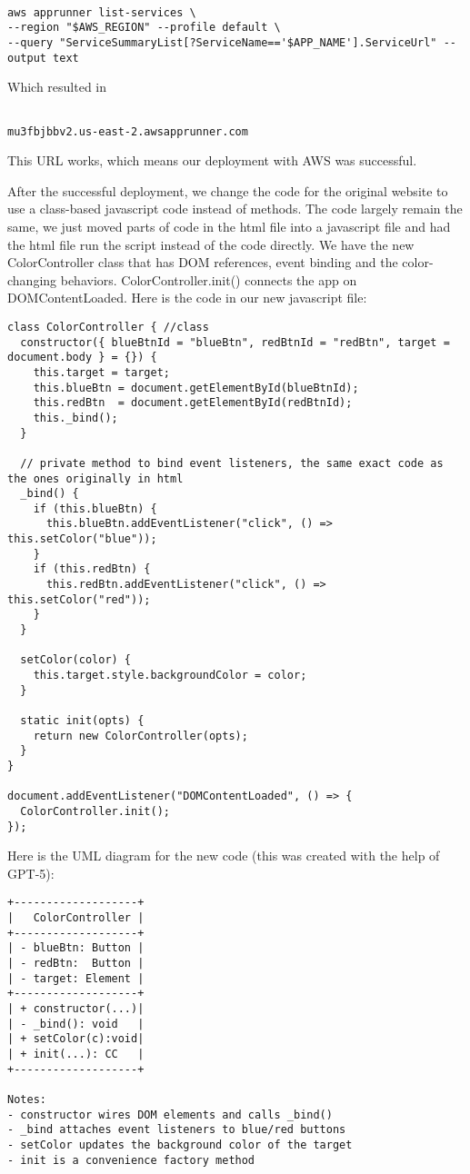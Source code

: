 \begin{verbatim}

aws apprunner list-services \
--region "$AWS_REGION" --profile default \
--query "ServiceSummaryList[?ServiceName=='$APP_NAME'].ServiceUrl" --output text

\end{verbatim}

\noindent Which resulted in

\begin{verbatim}

mu3fbjbbv2.us-east-2.awsapprunner.com

\end{verbatim}

\noindent This URL works, which means our deployment with AWS was successful.


\noindent After the successful deployment, we change the code for the original website to use a class-based javascript code instead of methods. The code largely remain the same, we just moved parts of code in the html file into a javascript file and had the html file run the script instead of the code directly. We have the new ColorController class that has DOM references, event binding and the color-changing behaviors. ColorController.init() connects the app on DOMContentLoaded. Here is the code in our new javascript file:

\begin{verbatim}
class ColorController { //class 
  constructor({ blueBtnId = "blueBtn", redBtnId = "redBtn", target = document.body } = {}) {
    this.target = target;
    this.blueBtn = document.getElementById(blueBtnId);
    this.redBtn  = document.getElementById(redBtnId);
    this._bind();
  }

  // private method to bind event listeners, the same exact code as the ones originally in html
  _bind() {
    if (this.blueBtn) {
      this.blueBtn.addEventListener("click", () => this.setColor("blue"));
    }
    if (this.redBtn) {
      this.redBtn.addEventListener("click", () => this.setColor("red"));
    }
  }

  setColor(color) {
    this.target.style.backgroundColor = color;
  }

  static init(opts) {
    return new ColorController(opts);
  }
}

document.addEventListener("DOMContentLoaded", () => {
  ColorController.init();
});

\end{verbatim}

Here is the UML diagram for the new code (this was created with the help of GPT-5):

\begin{verbatim}
+-------------------+
|   ColorController |
+-------------------+
| - blueBtn: Button |
| - redBtn:  Button |
| - target: Element |
+-------------------+
| + constructor(...)|
| - _bind(): void   |
| + setColor(c):void|
| + init(...): CC   |
+-------------------+

Notes:
- constructor wires DOM elements and calls _bind()
- _bind attaches event listeners to blue/red buttons
- setColor updates the background color of the target
- init is a convenience factory method
\end{verbatim}
